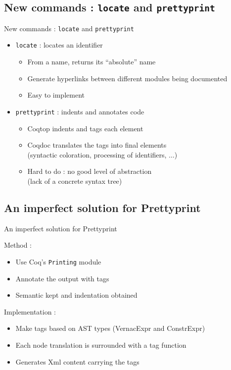 \documentclass[compress]{beamer}
\newenvironment{tframe}[1]{
  \subsection{#1}
  \begin{frame}{#1}
  }{
  \end{frame}
  }
\begin{document}
  \begin{tframe}{New commands : \texttt{locate} and \texttt{prettyprint}}
    \begin{itemize}
      \item \texttt{locate} : locates an identifier
        \begin{itemize}
          \item From a name, returns its ``absolute'' name
          \item Generate hyperlinks between different modules being documented
          \item Easy to implement
        \end{itemize}
        \vfill
      \item \texttt{prettyprint} : indents and annotates code
        \begin{itemize}
          \item Coqtop indents and tags each element
          \item Coqdoc translates the tags into final elements \\
            \small (syntactic coloration, processing of identifiers, $\ldots$)
          \item Hard to do : no good level of abstraction \\
            \small (lack of a concrete syntax tree)
        \end{itemize}
    \end{itemize}
  \end{tframe}

  \begin{tframe}{An imperfect solution for Prettyprint}

    Method :
    \begin{itemize}
      \item Use Coq's \texttt{Printing} module
      \item Annotate the output with tags
      \item Semantic kept and indentation obtained
    \end{itemize}
    Implementation :
    \begin{itemize}
      \item Make tags based on AST types (VernacExpr and ConstrExpr)
      \item Each node translation is surrounded with a tag function
      \item Generates Xml content carrying the tags
    \end{itemize}
  \end{tframe}
\end{document}
